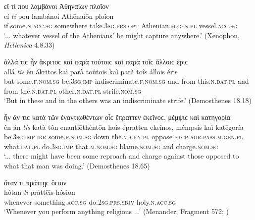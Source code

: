 \begin{exe}
\ex εἴ τί που λαμβάνοι Ἀθηναίων πλοῖον\\
\gll eí \emph{tí} pou lambánoi Athēnaíōn ploîon\\
if some.\textsc{n.acc.sg} somewhere take.\textsc{3sg.prs.opt} Athenian.\textsc{m.gen.pl} vessel.\textsc{acc.sg}\\
\trans `... whatever vessel of the Athenians' he might capture anywhere.' (Xenophon, \textit{Hellenica} 4.8.33)
\label{tis30}
\end{exe}

\begin{exe}
\ex ἀλλά τιϲ ἦν ἄκριτοϲ καὶ παρὰ τούτοιϲ καὶ παρὰ τοῖϲ ἄλλοιϲ ἔριϲ\\
\gll allá \emph{tis} ên ákritos kaì parà toútois kaì parà toîs állois éris\\
but some.\textsc{f.nom.sg} be.\textsc{3sg.imp} indiscriminate.\textsc{f.nom.sg} and from this.\textsc{n.dat.pl} and from the.\textsc{n.dat.pl} other.\textsc{n.dat.pl} strife.\textsc{nom.sg}\\
\trans `But in these and in the others was an indiscriminate strife.' (Demosthenes 18.18)
\label{tis31}
\end{exe}

\begin{exe}
\ex ἦν ἄν τιϲ κατὰ τῶν ἐναντιωθέντων οἷϲ ἔπραττεν ἐκεῖνοϲ, μέμψιϲ καὶ κατηγορία\\
\gll ên án \emph{tis} katà tôn enantiōthéntōn hoîs épratten ekeînos, mémpsis kaì katēgoría\\
be.\textsc{3sg.imp} \textsc{irr} some.\textsc{f.nom.sg} down the.\textsc{m.gen.pl} oppose.\textsc{ptcp.aor.pass.m.gen.pl} what.\textsc{dat.pl} do.\textsc{3sg.imp} that.\textsc{m.nom.sg} blame.\textsc{nom.sg} and charge.\textsc{nom.sg}\\
\trans `... there might have been some reproach and charge against those opposed to what that man was doing.' (Demosthenes 18.65)
\label{tis32}
\end{exe}

\begin{exe}
\ex ὅταν τι πράττῃϲ ὅϲιον\\
\gll hótan \emph{ti} práttēis hósion\\
whenever something.\textsc{acc.sg} do.\textsc{2sg.prs.sbjv} holy.\textsc{n.acc.sg}\\
\trans `Whenever you perform anything religious ...' (Menander, Fragment 572; \citealp{Kock1888})
\label{tis33}
\end{exe}

